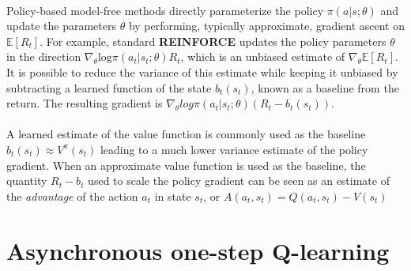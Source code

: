 \documentclass[12pt,a4paper]{article}
\begin{document}
\paragraph{}Policy-based model-free methods directly parameterize the policy $\pi(a|s;\theta)$ and update the parameters $\theta$ by performing, typically approximate, gradient ascent on $\mathbb{E}[R_{t}]$. For example, standard \textbf{REINFORCE} updates the policy parameters $\theta$ in the direction $\nabla_{\theta}\text{log}\pi(a_{t}|s_{t}; \theta)R_{t}$, which is an unbiased estimate of $\nabla_{\theta}\mathbb{E}[R_{t}]$. It is possible to reduce the variance of this estimate while keeping it unbiased by subtracting a learned function of the state $b_{t}(s_{t})$, known as a baseline from the return. The resulting gradient is \uline{$\nabla_{\theta}log\pi(a_{t}|s_{t}; \theta)(R_{t} - b_{t}(s_{t}))$}.

\paragraph{}A learned estimate of the value function is commonly used as the baseline $b_{t}(s_{t}) \approx V^{\pi}(s_{t})$ leading to a much lower variance estimate of the policy gradient. When an approximate value function is used as the baseline, the quantity $R_{t} - b_{t}$ used to scale the policy gradient can be seen as an estimate of the \textit{advantage} of the action $a_{t}$ in state $s_t$, or $A(a_{t}, s_{t}) = Q(a_{t}, s_{t}) - V(s_{t})$


\section{Asynchronous one-step Q-learning}
\end{document}
